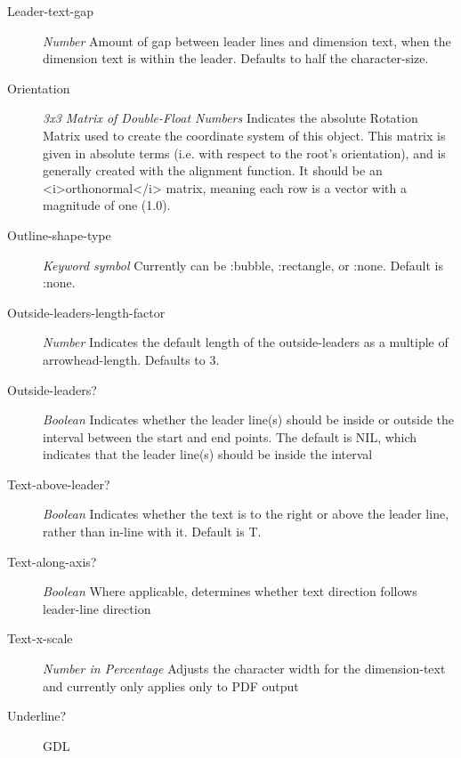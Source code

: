 \documentclass [11pt]{book}
\begin{document}
\begin{itemize}
\begin{description}
\item [Leader-text-gap]
\emph{Number} Amount of gap between leader lines and dimension text, when the dimension text is within the leader.
Defaults to half the character-size.


\item [Orientation]
\emph{3x3 Matrix of Double-Float Numbers} Indicates the absolute Rotation Matrix used to create
the coordinate system of this object. This matrix is given in absolute terms (i.e. with
respect to the root's orientation), and is generally created with the alignment function.
It should be an <i>orthonormal</i> matrix, meaning each row is a vector with a magnitude
of one (1.0).


\item [Outline-shape-type]
\emph{Keyword symbol} Currently can be :bubble, :rectangle, or :none. Default is :none.


\item [Outside-leaders-length-factor]
\emph{Number} Indicates the default length of the outside-leaders as a multiple of arrowhead-length.
Defaults to 3.


\item [Outside-leaders?]
\emph{Boolean} Indicates whether the leader line(s) should be inside or outside the interval between the start and
end points. The default is NIL, which indicates that the leader line(s) should be inside the interval


\item [Text-above-leader?]
\emph{Boolean} Indicates whether the text is to the right or above the leader line, rather than in-line with it. Default is T.


\item [Text-along-axis?]
\emph{Boolean} Where applicable, determines whether text direction follows leader-line direction


\item [Text-x-scale]
\emph{Number in Percentage} Adjusts the character width for the dimension-text and currently only applies only to PDF output


\item [Underline?]
GDL



\end{description}
\end{itemize}
\end{document}
